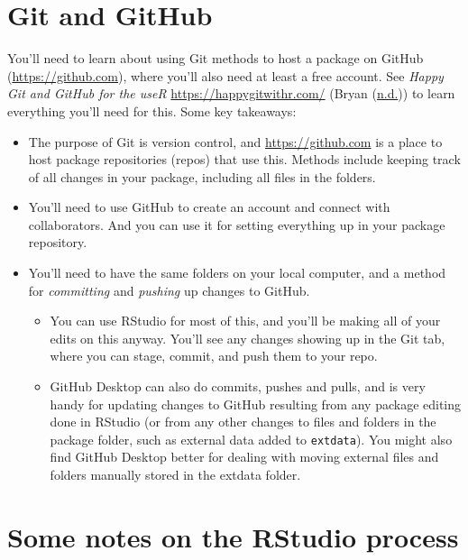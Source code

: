 \documentclass[
]{book}
\providecommand{\tightlist}{%
  \setlength{\itemsep}{0pt}\setlength{\parskip}{0pt}}
\begin{document}
\hypertarget{git-and-github}{%
\section*{Git and GitHub}\label{git-and-github}}


You'll need to learn about using Git methods to host a package on GitHub (\url{https://github.com}), where you'll also need at least a free account. See \emph{Happy Git and GitHub for the useR} \url{https://happygitwithr.com/} (Bryan (\protect\hyperlink{ref-happygitwithr}{n.d.})) to learn everything you'll need for this. Some key takeaways:

\begin{itemize}
\item
  The purpose of Git is version control, and \url{https://github.com} is a place to host package repositories (repos) that use this. Methods include keeping track of all changes in your package, including all files in the folders.
\item
  You'll need to use GitHub to create an account and connect with collaborators. And you can use it for setting everything up in your package repository.
\item
  You'll need to have the same folders on your local computer, and a method for \emph{committing} and \emph{pushing} up changes to GitHub.

  \begin{itemize}
  \tightlist
  \item
    You can use RStudio for most of this, and you'll be making all of your edits on this anyway. You'll see any changes showing up in the Git tab, where you can stage, commit, and push them to your repo.\\
  \item
    GitHub Desktop can also do commits, pushes and pulls, and is very handy for updating changes to GitHub resulting from any package editing done in RStudio (or from any other changes to files and folders in the package folder, such as external data added to \texttt{extdata}). You might also find GitHub Desktop better for dealing with moving external files and folders manually stored in the extdata folder.
  \end{itemize}
\end{itemize}

\hypertarget{some-notes-on-the-rstudio-process}{%
\section*{Some notes on the RStudio process}\label{some-notes-on-the-rstudio-process}}
\end{document}
